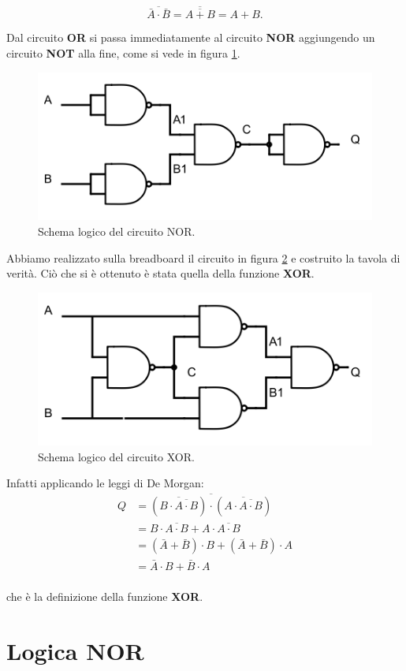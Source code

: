 \documentclass[journal, a4paper]{IEEEtran}
\begin{document}
\begin{equation}
\overline{\bar{A} \cdot \bar{B}} = \overline{\overline{A + B}} = A + B.
\end{equation}

Dal circuito \textbf{OR} si passa immediatamente al circuito \textbf{NOR} aggiungendo un circuito \textbf{NOT} alla fine, come si vede in figura \ref{fig:nor}.

\begin{figure}[htp]
\centering
\includegraphics[scale=.5]{nor}
\caption{Schema logico del circuito NOR.}
\label{fig:nor}
\end{figure}

Abbiamo realizzato sulla breadboard il circuito in figura \ref{fig:xor} e costruito la tavola di verità. Ciò che si è ottenuto è stata quella della funzione \textbf{XOR}.

\begin{figure}[htp]
\centering
\includegraphics[scale=.5]{xor}
\caption{Schema logico del circuito XOR.}
\label{fig:xor}
\end{figure}

Infatti applicando le leggi di De Morgan:
\begin{equation}
\begin{split}
Q & = \overline{(\overline{B \cdot \overline{A \cdot B}})\cdot (\overline{A \cdot \overline{A \cdot B}})} \\
  & = B \cdot \overline{A \cdot B} + A \cdot \overline{A \cdot B} \\
  & =(\bar{A} + \bar{B})\cdot B + (\bar{A} + \bar{B})\cdot A \\
  & = \bar{A}\cdot B + \bar{B} \cdot A \\
\end{split}
\end{equation}

che è la definizione della funzione \textbf{XOR}.

\section{Logica NOR}
\end{document}
